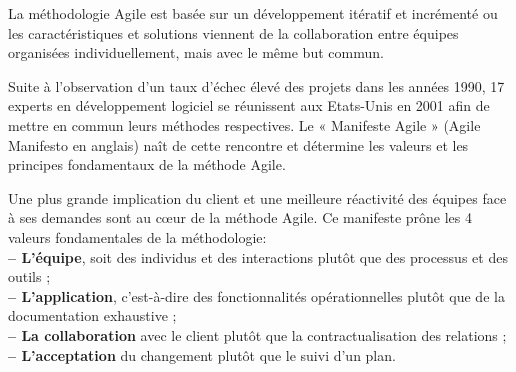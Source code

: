\documentclass[a4paper, 12pt]{report}
\begin{document}
La méthodologie Agile est basée sur un développement itératif et incrémenté ou les caractéristiques et solutions viennent de la collaboration entre équipes organisées individuellement, mais avec le même but commun. 

Suite à l'observation d'un taux d’échec élevé des projets dans les années 1990, 17 experts en développement logiciel se réunissent aux Etats-Unis en 2001 afin de mettre en commun leurs méthodes respectives. Le « Manifeste Agile » (Agile Manifesto en anglais) naît de cette rencontre et détermine les valeurs et les principes fondamentaux de la méthode Agile. 

Une plus grande implication du client et une meilleure réactivité des équipes face à ses demandes sont au cœur de la méthode Agile. Ce manifeste prône les 4 valeurs fondamentales de la méthodologie: \\
\textbf{-- L'équipe}, soit des individus et des interactions plutôt que des processus et des outils ; \\
\textbf{-- L’application}, c'est-à-dire des fonctionnalités opérationnelles plutôt que de la documentation exhaustive ; \\
\textbf{-- La collaboration} avec le client plutôt que la contractualisation des relations ; \\
\textbf{-- L’acceptation} du changement plutôt que le suivi d'un plan. \\
\end{document}
